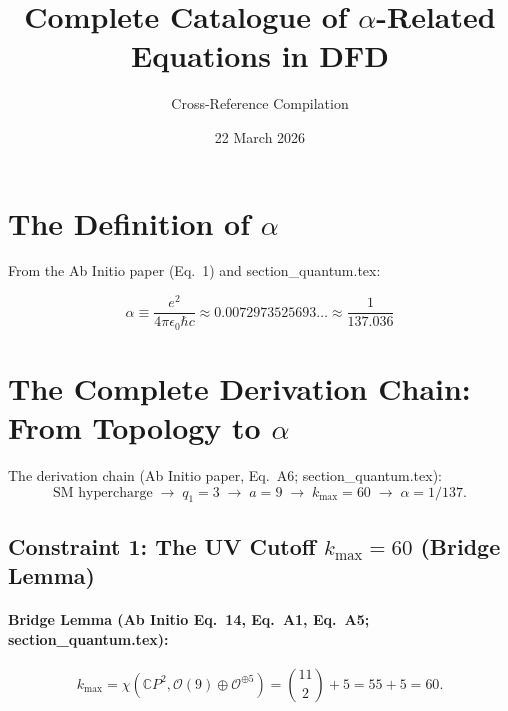 \documentclass[11pt]{article}
\title{Complete Catalogue of $\alpha$-Related Equations in DFD}
\author{Cross-Reference Compilation}
\date{22 March 2026}
\begin{document}
\maketitle

\tableofcontents
\newpage

\section{The Definition of $\alpha$}

From the Ab Initio paper (Eq.~1) and section\_quantum.tex:

\begin{equation}\tag{AbInit-1}
\alpha \equiv \frac{e^2}{4\pi\epsilon_0\hbar c} \approx 0.0072973525693\ldots \approx \frac{1}{137.036}
\end{equation}

\section{The Complete Derivation Chain: From Topology to $\alpha$}

The derivation chain (Ab Initio paper, Eq.~A6; section\_quantum.tex):
\begin{equation}\tag{Chain}
\text{SM hypercharge} \;\to\; q_1 = 3 \;\to\; a = 9 \;\to\; k_{\max} = 60 \;\to\; \alpha = 1/137.
\end{equation}

\subsection{Constraint 1: The UV Cutoff $k_{\max} = 60$ (Bridge Lemma)}

\paragraph{Bridge Lemma (Ab Initio Eq.~14, Eq.~A1, Eq.~A5; section\_quantum.tex):}
\begin{equation}\tag{BL-1}
k_{\max} = \chi(\mathbb{C}P^2, \mathcal{O}(9) \oplus \mathcal{O}^{\oplus 5}) = \binom{11}{2} + 5 = 55 + 5 = 60.
\end{equation}
\end{document}
